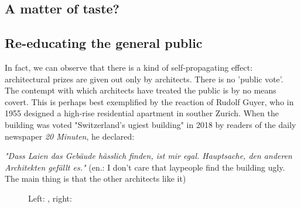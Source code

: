 \documentclass{article}
\begin{document}
\subsection{A matter of taste?}

\subsection{Re-educating the general public}

In fact, we can observe that there is a kind of self-propagating effect: architectural prizes are given out only by architects. There is no 'public vote'. The contempt with which architects have treated the public is by no means covert. This is perhaps best exemplified by the reaction of Rudolf Guyer, who in 1955 designed a high-rise residential apartment in souther Zurich. When the building was voted "Switzerland's ugiest building" in 2018 by readers of the daily newspaper \textit{20 Minuten}, he declared:

\textit{"Dass Laien das Gebäude hässlich finden, ist mir egal. Hauptsache, den anderen Architekten gefällt es."} (en.: I don't care that laypeople find the building ugly. The main thing is that the other architects like it) 



\begin{figure}[ht!]
    \centering
    \caption{Left: \cite{wikimedia_commons_user_moreau1_epa_2018}, right: \cite{highsmith_robert_2012}}
    \label{fig:kunstformen}
\end{figure}
\end{document}
